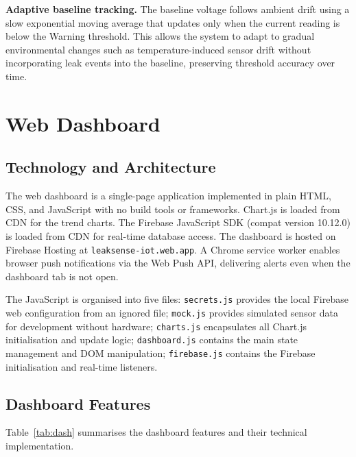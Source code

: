 \documentclass[a4paper,10pt,conference,onecolumn]{IEEEtran}
\begin{document}
\textbf{Adaptive baseline tracking.} The baseline voltage follows
ambient drift using a slow exponential moving average that updates
only when the current reading is below the Warning threshold. This
allows the system to adapt to gradual environmental changes such as
temperature-induced sensor drift without incorporating leak events
into the baseline, preserving threshold accuracy over time.
\section{Web Dashboard}
\label{sec:dashboard}

\subsection{Technology and Architecture}

The web dashboard is a single-page application implemented in plain HTML, CSS,
and JavaScript with no build tools or frameworks. Chart.js is loaded from CDN
for the trend charts. The Firebase JavaScript SDK (compat version 10.12.0) is
loaded from CDN for real-time database access. The dashboard is hosted on
Firebase Hosting at \texttt{leaksense-iot.web.app}. A Chrome service worker
enables browser push notifications via the Web Push API, delivering alerts
even when the dashboard tab is not open.

The JavaScript is organised into five files: \texttt{secrets.js} provides the
local Firebase web configuration from an ignored file; \texttt{mock.js} provides
simulated sensor data for development without hardware; \texttt{charts.js}
encapsulates all Chart.js initialisation and update logic; \texttt{dashboard.js}
contains the main state management and DOM manipulation; \texttt{firebase.js}
contains the Firebase initialisation and real-time listeners.

\subsection{Dashboard Features}

Table~\ref{tab:dash} summarises the dashboard features and their technical
implementation.
\end{document}
